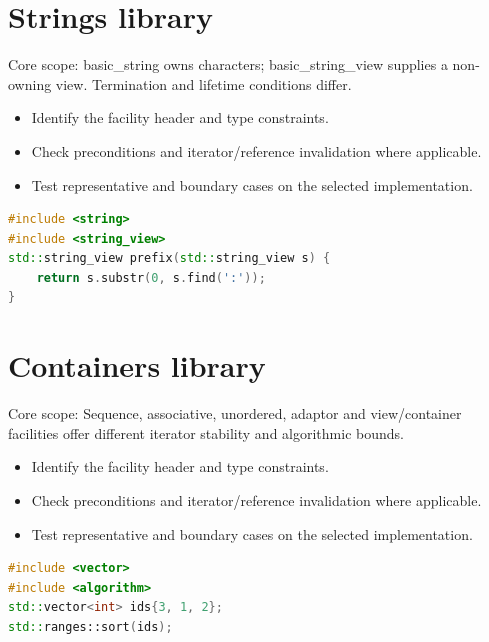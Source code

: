 \documentclass[11pt]{article}
\begin{document}
\section{Strings library}
Core scope: basic\_string owns characters; basic\_string\_view supplies a non-owning view. Termination and lifetime conditions differ.

\begin{itemize}[leftmargin=*,itemsep=1pt,topsep=3pt]
\item Identify the facility header and type constraints.
\item Check preconditions and iterator/reference invalidation where applicable.
\item Test representative and boundary cases on the selected implementation.
\end{itemize}
\begin{lstlisting}[language=C++]
#include <string>
#include <string_view>
std::string_view prefix(std::string_view s) {
    return s.substr(0, s.find(':'));
}
\end{lstlisting}
\section{Containers library}
Core scope: Sequence, associative, unordered, adaptor and view/container facilities offer different iterator stability and algorithmic bounds.

\begin{itemize}[leftmargin=*,itemsep=1pt,topsep=3pt]
\item Identify the facility header and type constraints.
\item Check preconditions and iterator/reference invalidation where applicable.
\item Test representative and boundary cases on the selected implementation.
\end{itemize}
\begin{lstlisting}[language=C++]
#include <vector>
#include <algorithm>
std::vector<int> ids{3, 1, 2};
std::ranges::sort(ids);
\end{lstlisting}
\end{document}

